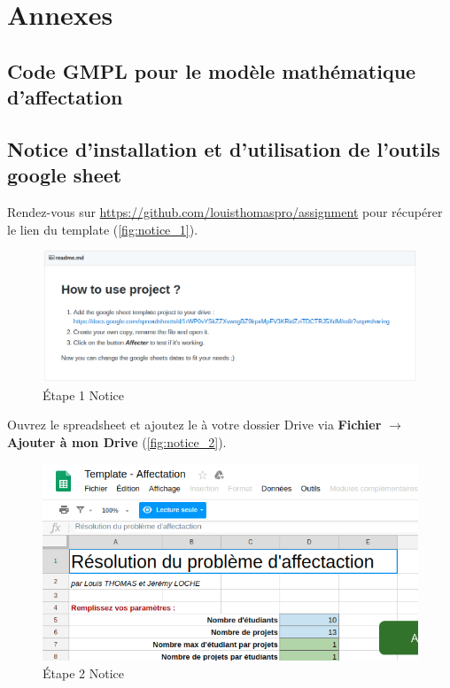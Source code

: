 \documentclass[final,poster]{polytech/polytech}
\begin{document}


\chapter*{Annexes}

\section{Code GMPL pour le modèle mathématique d'affectation\label{src:gmpl_source_model}}



\section{Notice d'installation et d'utilisation de l'outils google sheet\label{src:notice_utilisation}}


Rendez-vous sur \url{https://github.com/louisthomaspro/assignment} pour récupérer le lien du template (\autoref{fig:notice_1}).
\begin{figure}[htbp]
\includegraphics[width=13cm]{images/notice/notice_1}
\caption{\label{fig:notice_1}\'Etape 1 Notice}
\end{figure}

Ouvrez le spreadsheet et ajoutez le à votre dossier Drive via \textbf{Fichier} $\rightarrow$ \textbf{Ajouter à mon Drive} (\autoref{fig:notice_2}).
\begin{figure}[htbp]
\includegraphics[width=13cm]{images/notice/notice_2}
\caption{\label{fig:notice_2}\'Etape 2 Notice}
\end{figure}
\end{document}

